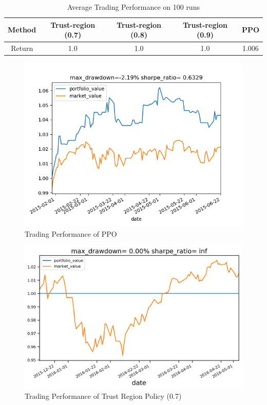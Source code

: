 \documentclass[11pt,a4paper]{article}
\begin{document}
\begin{table}
  \centering
  \caption{Average Trading Performance on 100 runs}
  \begin{tabular}{|c|c|c|c|c|}
    \hline
    Method & Trust-region (0.7) & Trust-region (0.8) & Trust-region (0.9) & PPO \\\hline
    Return & 1.0  & 1.0 & 1.0 &  1.006 \\\hline
  \end{tabular}
  \label{table:trading_performance}
\end{table}

\begin{figure}
  \centering
  \includegraphics[width=\linewidth]{ppo_trading}
  \caption{Trading Performance of PPO}
  \label{fig:ppo_trading}
\end{figure}

\begin{figure}
  \centering
  \includegraphics[width=\linewidth]{trust_region_trading}
  \caption{Trading Performance of Trust Region Policy (0.7)}
  \label{fig:trust_region_trading}
\end{figure}
\end{document}
